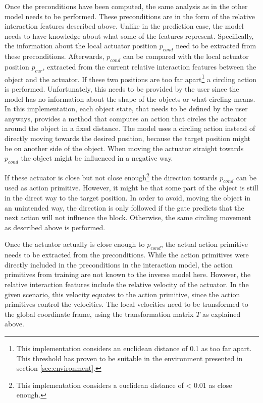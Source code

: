 Once the preconditions have been computed, the same analysis as in the other model needs to be performed. These preconditions are in the form of the relative interaction features described above. Unlike in the prediction case, the model needs to have knowledge about what some of the features represent. Specifically, the information about the local actuator position $p_{cond}$ need to be extracted from these preconditions. Afterwards, $p_{cond}$ can be compared with the local actuator position $p_{cur}$, extracted from the current relative interaction features between the object and the actuator. 
If these two positions are too far apart\footnote{This implementation considers an euclidean distance of 0.1 as too far apart. This threshold has proven to be suitable in the environment presented in section \ref{sec:environment}.} a circling action is performed. Unfortunately, this needs to be provided by the user since the model has no information about the shape of the objects or what circling means. In this implementation, each object state, that needs to be defined by the user anyways, provides a method that computes an action that circles the actuator around the object in a fixed distance. %
The model uses a circling action instead of directly moving towards the desired position, because the target position might be on another side of the object. When moving the actuator straight towards $p_{cond}$ the object might be influenced in a negative way.

If these actuator is close but not close enough\footnote{This implementation considers a euclidean distance of < 0.01 as close enough.} the direction towards $p_{cond}$ can be used as action primitive. 
However, it might be that some part of the object is still in the direct way to the target position. In order to avoid, moving the object in an unintended way, the direction is only followed if the gate predicts that the next action will not influence the block. Otherwise, the same circling movement as described above is performed.

Once the actuator actually is close enough to $p_{cond}$, the actual action primitive needs to be extracted from the preconditions. While the action primitives were directly included in the preconditions in the interaction model, the action primitives from training are not known to the inverse model here. However, the relative interaction features include the relative velocity of the actuator. In the given scenario, this velocity equates to the action primitive, since the action primitives control the velocities. The local velocities need to be transformed to the global coordinate frame, using the transformation matrix $T$ as explained above.



